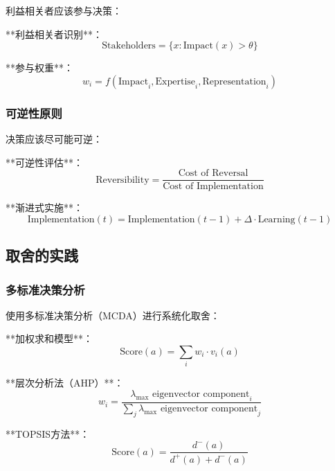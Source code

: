 利益相关者应该参与决策：

**利益相关者识别**：
\begin{equation}
\text{Stakeholders} = \{x : \text{Impact}(x) > \theta\}
\end{equation}

**参与权重**：
\begin{equation}
w_i = f(\text{Impact}_i, \text{Expertise}_i, \text{Representation}_i)
\end{equation}

\subsubsection{可逆性原则}

决策应该尽可能可逆：

**可逆性评估**：
\begin{equation}
\text{Reversibility} = \frac{\text{Cost of Reversal}}{\text{Cost of Implementation}}
\end{equation}

**渐进式实施**：
\begin{equation}
\text{Implementation}(t) = \text{Implementation}(t-1) + \Delta \cdot \text{Learning}(t-1)
\end{equation}

\subsection{取舍的实践}

\subsubsection{多标准决策分析}

使用多标准决策分析（MCDA）进行系统化取舍：

**加权求和模型**：
\begin{equation}
\text{Score}(a) = \sum_i w_i \cdot v_i(a)
\end{equation}

**层次分析法（AHP）**：
\begin{equation}
w_i = \frac{\lambda_{\max} \text{ eigenvector component}_i}{\sum_j \lambda_{\max} \text{ eigenvector component}_j}
\end{equation}

**TOPSIS方法**：
\begin{equation}
\text{Score}(a) = \frac{d^-(a)}{d^+(a) + d^-(a)}
\end{equation}


